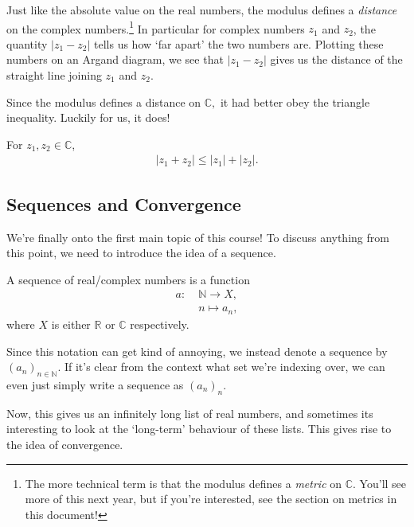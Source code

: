 \documentclass[
  10pt,
  a4paper]{article}
\theoremstyle{plain}
\theoremstyle{definition}
\theoremstyle{plain}
\theoremstyle{plain}
\theoremstyle{plain}
\theoremstyle{plain}
\theoremstyle{definition}
\theoremstyle{definition}
\theoremstyle{remark}
\theoremstyle{remark}
\let\BeginKnitrBlock\begin \let\EndKnitrBlock\end
\begin{document}
Just like the absolute value on the real numbers, the modulus defines a \emph{distance} on the complex numbers.\footnote{The more technical term is that the modulus defines a \emph{metric} on \(\mathbb{C}.\) You'll see more of this next year, but if you're interested, see the section on metrics in this document!} In particular for complex numbers \(z_1\) and \(z_2\), the quantity \(\lvert z_1 - z_2 \rvert\) tells us how `far apart' the two numbers are. Plotting these numbers on an Argand diagram, we see that \(\lvert z_1 - z_2 \rvert\) gives us the distance of the straight line joining \(z_1\) and \(z_2.\)

Since the modulus defines a distance on \(\mathbb{C},\) it had better obey the triangle inequality. Luckily for us, it does!

\BeginKnitrBlock{proposition}[Triangle Inequality]
{\label{prp:prop3} }For \(z_1,z_2 \in \mathbb{C}\),
\begin{align*}
\lvert z_1 + z_2 \rvert \leq \lvert z_1 \rvert + \lvert z_2 \rvert.
\end{align*}
\EndKnitrBlock{proposition}

\hypertarget{sequences-and-convergence}{%
\subsection{Sequences and Convergence}\label{sequences-and-convergence}}

We're finally onto the first main topic of this course! To discuss anything from this point, we need to introduce the idea of a sequence.
\BeginKnitrBlock{definition}[Sequence]
{\label{def:def1} }A sequence of real/complex numbers is a function
\begin{align*}
    a:\; &\mathbb{N} \longrightarrow X,\\
    &n \longmapsto a_n,
\end{align*}
where \(X\) is either \(\mathbb{R}\) or \(\mathbb{C}\) respectively.
\EndKnitrBlock{definition}
Since this notation can get kind of annoying, we instead denote a sequence by \((a_n)_{n\in\mathbb{N}}\). If it's clear from the context what set we're indexing over, we can even just simply write a sequence as \((a_n)_n\).

Now, this gives us an infinitely long list of real numbers, and sometimes its interesting to look at the `long-term' behaviour of these lists. This gives rise to the idea of convergence.
\end{document}
